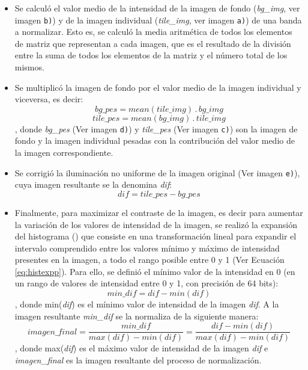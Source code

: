 \begin{itemize}
\justifying
\item Se calculó el valor medio de la intensidad de la imagen de fondo (\textit{bg\_img}, ver imagen \texttt{b)}) y de la imagen individual (\textit{tile\_img}, ver imagen \texttt{a)}) de una banda a normalizar. Esto es, se calculó la media aritmética de todos los elementos de matriz que representan a cada imagen, que es el resultado de la división entre la suma de todos los elementos de la matriz y el número total de los mismos.
\item Se multiplicó la imagen de fondo por el valor medio de la imagen individual y viceversa, es decir:
\begin{equation}
\textit{bg\_pes} = mean(\textit{tile\_img})\hspace{2pt} . \hspace{2pt}\textit{bg\_img}
\end{equation}
\begin{equation}
\textit{tile\_pes} = mean(\textit{bg\_img})\hspace{2pt} . \hspace{2pt}\textit{tile\_img}
\end{equation},
donde \textit{bg\_pes} (Ver imagen \texttt{d)}) y \textit{tile\_pes} (Ver imagen \texttt{c)}) son la imagen de fondo y la imagen individual pesadas con la contribución del valor medio de la imagen correspondiente.
\item Se corrigió la iluminación no uniforme de la imagen original (Ver imagen \texttt{e)}), cuya imagen resultante se la denomina \textit{dif}:
\begin{equation}
\textit{dif} = \textit{tile\_pes} - \textit{bg\_pes}
\end{equation}
\item Finalmente, para maximizar el contraste de la imagen, es decir para aumentar la variación de los valores de intensidad de la imagen, se realizó la expansión del histograma (\cite{anilfund}) que consiste en una transformación lineal para expandir el intervalo comprendido entre los valores mínimo y máximo de intensidad presentes en la imagen, a todo el rango posible entre 0 y 1 (Ver Ecuación \ref{eq:histexpp}). Para ello, se definió el mínimo valor de la intensidad en 0 (en un rango de valores de intensidad entre 0 y 1, con precisión de 64 bits):
\begin{equation}
	\textit{min\_dif} = \textit{dif} - min(\textit{dif})
\end{equation},
donde min(\textit{dif}) es el mínimo valor de intensidad de la imagen \textit{dif}. A la imagen resultante \textit{min\_dif} se la normaliza de la siguiente manera:
\begin{equation}
	\textit{imagen\_final} = \frac{\textit{min\_dif}}{max(\textit{dif})-min(\textit{dif})} = \frac{\textit{dif} - min(\textit{dif})}{max(\textit{dif})-min(\textit{dif})}
	\label{eq:histexpp}
\end{equation},
donde max(\textit{dif}) es el máximo valor de intensidad de la imagen \textit{dif} e \textit{imagen\_final} es la imagen resultante del proceso de normalización.
\end{itemize}

